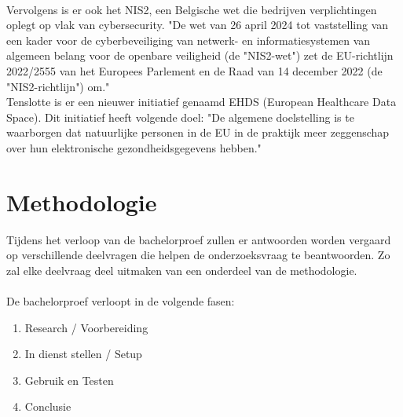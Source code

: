 \\
Vervolgens is er ook het NIS2, een Belgische wet die bedrijven verplichtingen oplegt op vlak van cybersecurity. "De wet van 26 april 2024 tot vaststelling van een kader voor de cyberbeveiliging van netwerk- en informatiesystemen van algemeen belang voor de openbare veiligheid (de "NIS2-wet") zet de EU-richtlijn 2022/2555 van het Europees Parlement en de Raad van 14 december 2022 (de "NIS2-richtlijn") om." \autocite{Belgium2024}
\\
Tenslotte is er een nieuwer initiatief genaamd EHDS (European Healthcare Data Space). Dit initiatief heeft volgende doel: "De algemene doelstelling is te waarborgen dat natuurlijke personen in de EU in de praktijk meer zeggenschap over hun elektronische gezondheidsgegevens hebben." \autocite{EHDS2022}


\section{Methodologie}%
\label{sec:methodologie}

Tijdens het verloop van de bachelorproef zullen er antwoorden worden vergaard op verschillende deelvragen die helpen de onderzoeksvraag te beantwoorden. Zo zal elke deelvraag deel uitmaken van een onderdeel van de methodologie.
\\\\
De bachelorproef verloopt in de volgende fasen:

\begin{enumerate}
  \item Research / Voorbereiding
  \item In dienst stellen / Setup
  \item Gebruik en Testen
  \item Conclusie
\end{enumerate}

